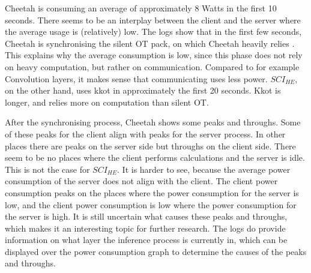 \documentclass[../thesis.tex]{subfiles}
\begin{document}
Cheetah is consuming an average of approximately 8 Watts in the first 10 seconds. There seems to be an interplay between the client and the server where the average usage is (relatively) low. The logs show that in the first few seconds, Cheetah is synchronising the silent OT pack, on which Cheetah heavily relies \parencite[p. 4]{cheetah}. This explains why the average consumption is low, since this phase does not rely on heavy computation, but rather on communication. Compared to for example Convolution layers, it makes sense that communicating uses less power. $SCI_{HE}$, on the other hand, uses kkot in approximately the first 20 seconds. Kkot is longer, and relies more on computation than silent OT.

After the synchronising process, Cheetah shows some peaks and throughs. Some of these peaks for the client align with peaks for the server process. In other places there are peaks on the server side but throughs on the client side. There seem to be no places where the client performs calculations and the server is idle. This is not the case for $SCI_{HE}$. It is harder to see, because the average power consumption of the server does not align with the client. The client power consumption peaks on the places where the power consumption for the server is low, and the client power consumption is low where the power consumption for the server is high. It is still uncertain what causes these peaks and throughs, which makes it an interesting topic for further research. The logs do provide information on what layer the inference process is currently in, which can be displayed over the power consumption graph to determine the causes of the peaks and throughs.
\end{document}
